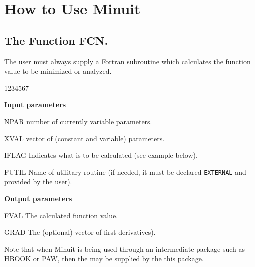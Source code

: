  
\chapter{How to Use Minuit}

\section{The Function FCN.}
The user must always supply a Fortran subroutine which calculates
the function value to be minimized or analyzed.
\medskip
{}

\begin{DLtt}{1234567}
\item[{\rm\bf Input parameters}] \mbox{}
\item[NPAR]  number of currently variable parameters.
\item[XVAL]  vector of (constant and variable) parameters.
\item[IFLAG] Indicates what is to be calculated (see example below).
\item[FUTIL] Name of utilitary routine (if needed, it
             must be declared \texttt{EXTERNAL} and provided by the user).
\item[{\rm\bf Output parameters}] \mbox{}
\item[FVAL]  The calculated function value.
\item[GRAD]  The (optional) vector of first derivatives).
\end{DLtt}

Note that when Minuit is being used through an intermediate package such as
HBOOK or PAW, then the  may be supplied by the this package.

